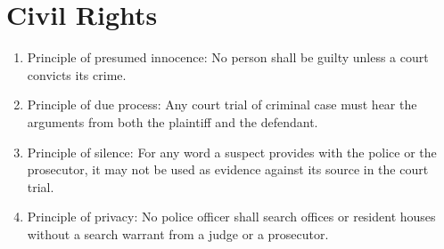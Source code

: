 \section{Civil Rights}
\begin{enumerate}[start=601]
	\item Principle of presumed innocence: No person shall be guilty unless a court convicts its crime.
	\item Principle of due process: Any court trial of criminal case must hear the arguments from both the plaintiff and the defendant.
	\item Principle of silence: For any word a suspect provides with the police or the prosecutor,
	      it may not be used as evidence against its source in the court trial.
	\item Principle of privacy: No police officer shall search offices or resident houses without a search warrant from
	      a judge or a prosecutor.
\end{enumerate}




